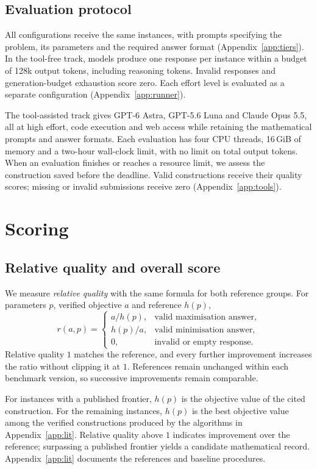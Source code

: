 \documentclass{article}
\begin{document}
\subsection{Evaluation protocol}
\label{sec:protocol}
All configurations receive the same instances, with prompts specifying the problem, its parameters and the required answer format (Appendix~\ref{app:tiers}). In the tool-free track, models produce one response per instance within a budget of 128k output tokens, including reasoning tokens. Invalid responses and generation-budget exhaustion score zero. Each effort level is evaluated as a separate configuration (Appendix~\ref{app:runner}).

The tool-assisted track gives GPT-6 Astra, GPT-5.6 Luna and Claude Opus 5.5, all at high effort, code execution and web access while retaining the mathematical prompts and answer formats. Each evaluation has four CPU threads, 16\,GiB of memory and a two-hour wall-clock limit, with no limit on total output tokens. When an evaluation finishes or reaches a resource limit, we assess the construction saved before the deadline. Valid constructions receive their quality scores; missing or invalid submissions receive zero (Appendix~\ref{app:tools}).

\section{Scoring}
\label{sec:scoring}

\subsection{Relative quality and overall score}
We measure \emph{relative quality} with the same formula for both reference groups. For parameters $p$, verified objective $a$ and reference $h(p)$,
\[
r(a,p)=
\begin{cases}
a/h(p), & \text{valid maximisation answer},\\
h(p)/a, & \text{valid minimisation answer},\\
0, & \text{invalid or empty response}.
\end{cases}
\]
Relative quality $1$ matches the reference, and every further improvement increases the ratio without clipping it at $1$. References remain unchanged within each benchmark version, so successive improvements remain comparable.

For instances with a published frontier, $h(p)$ is the objective value of the cited construction. For the remaining instances, $h(p)$ is the best objective value among the verified constructions produced by the algorithms in Appendix~\ref{app:lit}. Relative quality above $1$ indicates improvement over the reference; surpassing a published frontier yields a candidate mathematical record. Appendix~\ref{app:lit} documents the references and baseline procedures.
\end{document}
